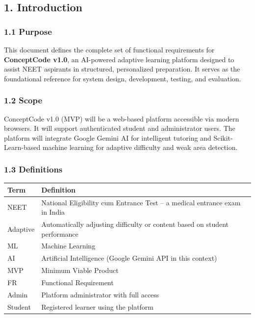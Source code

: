 \documentclass[
]{article}
\begin{document}
\subsection{1. Introduction}\label{introduction}

\subsubsection{1.1 Purpose}\label{purpose}

This document defines the complete set of functional requirements for
\textbf{ConceptCode v1.0}, an AI-powered adaptive learning platform
designed to assist NEET aspirants in structured, personalized
preparation. It serves as the foundational reference for system design,
development, testing, and evaluation.

\subsubsection{1.2 Scope}\label{scope}

ConceptCode v1.0 (MVP) will be a web-based platform accessible via
modern browsers. It will support authenticated student and administrator
users. The platform will integrate Google Gemini AI for intelligent
tutoring and Scikit-Learn-based machine learning for adaptive difficulty
and weak area detection.

\subsubsection{1.3 Definitions}\label{definitions}

\begin{longtable}[]{@{}
  >{\raggedright\arraybackslash}p{}
  >{\raggedright\arraybackslash}p{}@{}}
\toprule\noalign{}
\begin{minipage}[b]{\linewidth}\raggedright
Term
\end{minipage} & \begin{minipage}[b]{\linewidth}\raggedright
Definition
\end{minipage} \\
\midrule\noalign{}
\endhead
\bottomrule\noalign{}
\endlastfoot
NEET & National Eligibility cum Entrance Test -- a medical entrance exam
in India \\
Adaptive & Automatically adjusting difficulty or content based on
student performance \\
ML & Machine Learning \\
AI & Artificial Intelligence (Google Gemini API in this context) \\
MVP & Minimum Viable Product \\
FR & Functional Requirement \\
Admin & Platform administrator with full access \\
Student & Registered learner using the platform \\
\end{longtable}
\end{document}
